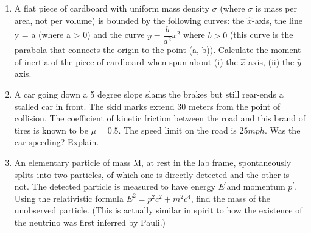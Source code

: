 \documentclass[fleqn]{article}
\begin{document}
\begin{enumerate}
    \item A flat piece of cardboard with uniform mass density $\sigma$ (where $\sigma$ is mass
    per area, not per volume) is bounded by the following curves: the $\hat{x}$-axis, the line y = a (where a > 0) and the curve $y=\dfrac{b}{a^2}x^2$ 
    where $b>0$ (this curve is the parabola that connects the origin to the point (a, b)).
    Calculate the moment of inertia of the piece of cardboard when spun
    about (i) the $\hat{x}$-axis, (ii) the $\hat{y}$-axis.



    \item A car going down a 5 degree slope slams the brakes but still rear-ends a
    stalled car in front. The skid marks extend 30 meters from the point of
    collision. The coefficient of kinetic friction between the road and this
    brand of tires is known to be $\mu=0.5$. The speed limit on the road is
    $25 mph$. Was the car speeding? Explain.



    \item An elementary particle of mass M, at rest in the lab frame, spontaneously splits into two particles, of which one is directly detected and
    the other is not. The detected particle is measured to have energy $E^{\prime}$and momentum $p^{\prime}$. Using the relativistic formula
    $E^2=p^2 c^2+m^2c^4$, find the mass of the unobserved particle. (This is actually similar in
    spirit to how the existence of the neutrino was first inferred by Pauli.)

     
  \end{enumerate}
\end{document}
